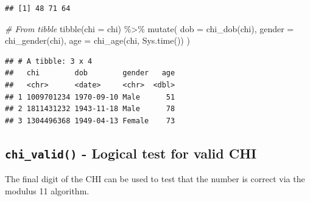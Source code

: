 \documentclass[
]{book}
\newenvironment{Shaded}{\begin{snugshade}}{\end{snugshade}}
\newcommand{\AttributeTok}[1]{\textcolor[rgb]{0.77,0.63,0.00}{#1}}
\newcommand{\CommentTok}[1]{\textcolor[rgb]{0.56,0.35,0.01}{\textit{#1}}}
\newcommand{\FunctionTok}[1]{\textcolor[rgb]{0.00,0.00,0.00}{#1}}
\newcommand{\NormalTok}[1]{#1}
\newcommand{\SpecialCharTok}[1]{\textcolor[rgb]{0.00,0.00,0.00}{#1}}
\begin{document}
\begin{verbatim}
## [1] 48 71 64
\end{verbatim}

\begin{Shaded}
\begin{Highlighting}[]
\CommentTok{\# From tibble}
\FunctionTok{tibble}\NormalTok{(}\AttributeTok{chi =}\NormalTok{ chi) }\SpecialCharTok{\%\textgreater{}\%} 
  \FunctionTok{mutate}\NormalTok{(}
    \AttributeTok{dob =} \FunctionTok{chi\_dob}\NormalTok{(chi),}
    \AttributeTok{gender =} \FunctionTok{chi\_gender}\NormalTok{(chi),}
    \AttributeTok{age =} \FunctionTok{chi\_age}\NormalTok{(chi, }\FunctionTok{Sys.time}\NormalTok{())}
\NormalTok{  )}
\end{Highlighting}
\end{Shaded}

\begin{verbatim}
## # A tibble: 3 x 4
##   chi        dob        gender   age
##   <chr>      <date>     <chr>  <dbl>
## 1 1009701234 1970-09-10 Male      51
## 2 1811431232 1943-11-18 Male      78
## 3 1304496368 1949-04-13 Female    73
\end{verbatim}

\hypertarget{chi_valid---logical-test-for-valid-chi}{%
\subsection{\texorpdfstring{\texttt{chi\_valid()} - Logical test for valid CHI}{chi\_valid() - Logical test for valid CHI}}\label{chi_valid---logical-test-for-valid-chi}}

The final digit of the CHI can be used to test that the number is correct via the modulus 11 algorithm.
\end{document}
